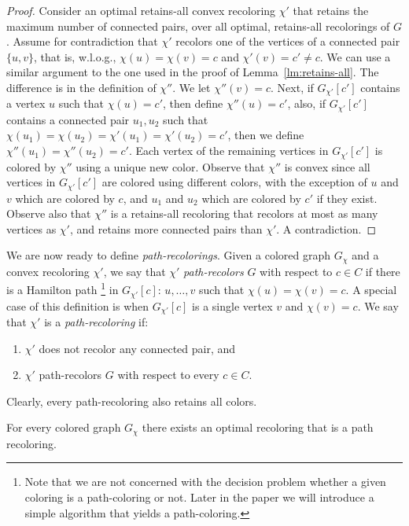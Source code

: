 \begin{proof}
Consider an optimal retains-all convex recoloring $\chi'$ 
that retains the maximum number of connected pairs, 
over all optimal, 
retains-all recolorings of $G$.  
%
Assume for contradiction that $\chi'$ 
recolors one of the vertices of a connected pair $\{u, v\}$, 
that is, 
w.l.o.g., 
$\chi(u) = \chi(v) = c$ and $\chi'(v) = c' \neq c$.
%
We can use a similar argument to the one used in the proof of Lemma~\ref{lm:retains-all}.
%
The difference is in the definition of $\chi''$.  
%
We let $\chi''(v) = c$. 
Next, if $G_{\chi'}[c']$ contains a vertex $u$ such that $\chi(u) = c'$, 
then define $\chi''(u) = c'$, 
also, if $G_{\chi'}[c']$ contains a connected pair $u_1, u_2$ 
such that $\chi(u_1) = \chi(u_2) = \chi'(u_1) = \chi'(u_2) = c'$, 
then we define $\chi''(u_1) = \chi''(u_2) = c'$.
Each vertex of the remaining vertices in $G_{\chi'}[c']$ is colored by $\chi''$ 
using a unique new color.
%
Observe that $\chi''$ is convex since all vertices in $G_{\chi'}[c']$
are colored using different colors,
with the exception of $u$ and $v$ which are colored by $c$,
and $u_1$ and $u_2$ which are colored by $c'$ if they exist. 
%
Observe also that $\chi''$ is a retains-all recoloring that recolors at most as
many vertices as $\chi'$, and retains more connected pairs than $\chi'$. 
%
A contradiction.
{}\end{proof}

We are now ready to define \emph{path-recolorings}.
%
Given a colored graph $G_\chi$ and a convex recoloring $\chi'$, 
we say that $\chi'$ \emph{path-recolors} $G$ with respect to $c \in C$ 
if there is a Hamilton path 
\footnote{
Note that we are not concerned with the decision problem whether a given coloring 
is a path-coloring or not.
Later in the paper we will introduce a simple algorithm that yields a path-coloring. 
} 
in $G_{\chi'}[c]$: 
$u, \dots, v$ such that $\chi(u) = \chi(v) = c$.
%
A special case of this definition is when  $G_{\chi'}[c]$ 
is a single vertex $v$ and $\chi(v) = c$.
%
We say that $\chi'$ is a \emph{path-recoloring} if:
\begin{enumerate}
	\item $\chi'$ does not recolor any connected pair, and 
	\item $\chi'$ path-recolors $G$ with respect to every $c \in C$.
\end{enumerate}
Clearly, every path-recoloring also retains all colors.

\begin{lemma}
\label{lm:optimal_path_recoloring}
For every colored graph $G_\chi$ 
there exists an optimal recoloring that is a path recoloring.
\end{lemma}

